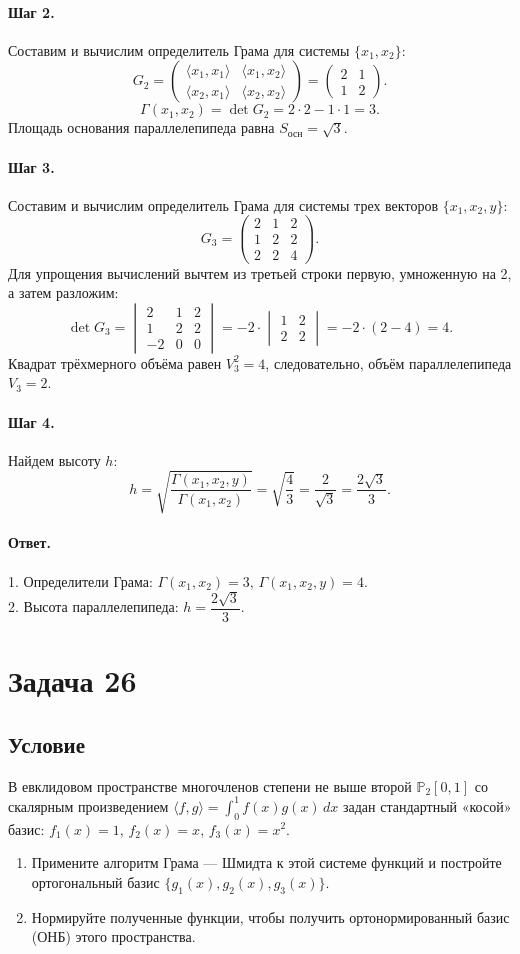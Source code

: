 \documentclass[12pt,a4paper]{article}
\theoremstyle{solution}
\newcommand{\task}[1]{\newpage\section*{Задача #1}}
\newcommand{\answer}{\paragraph{Ответ.}}
\newcommand{\step}[1]{\paragraph{Шаг #1.}}
\begin{document}
\step{2} Составим и вычислим определитель Грама для системы $\{x_1, x_2\}$:
\[
G_2 = \begin{pmatrix} \langle x_1, x_1\rangle & \langle x_1, x_2\rangle \\ \langle x_2, x_1\rangle & \langle x_2, x_2\rangle \end{pmatrix} = \begin{pmatrix} 2 & 1 \\ 1 & 2 \end{pmatrix}.
\]
\[
\Gamma(x_1, x_2) = \det G_2 = 2\cdot 2 - 1\cdot 1 = 3.
\]
Площадь основания параллелепипеда равна $S_{\text{осн}} = \sqrt{3}$.

\step{3} Составим и вычислим определитель Грама для системы трех векторов $\{x_1, x_2, y\}$:
\[
G_3 = \begin{pmatrix} 2 & 1 & 2 \\ 1 & 2 & 2 \\ 2 & 2 & 4 \end{pmatrix}.
\]
Для упрощения вычислений вычтем из третьей строки первую, умноженную на 2, а затем разложим:
\[
\det G_3 = \begin{vmatrix} 2 & 1 & 2 \\ 1 & 2 & 2 \\ -2 & 0 & 0 \end{vmatrix} = -2 \cdot \begin{vmatrix} 1 & 2 \\ 2 & 2 \end{vmatrix} = -2 \cdot (2 - 4) = 4.
\]
Квадрат трёхмерного объёма равен $V_3^2 = 4$, следовательно, объём параллелепипеда $V_3 = 2$.

\step{4} Найдем высоту $h$:
\[
h = \sqrt{\frac{\Gamma(x_1, x_2, y)}{\Gamma(x_1, x_2)}} = \sqrt{\frac{4}{3}} = \frac{2}{\sqrt{3}} = \frac{2\sqrt{3}}{3}.
\]

\answer
1. Определители Грама: $\Gamma(x_1, x_2) = 3$, $\Gamma(x_1, x_2, y) = 4$.\\
2. Высота параллелепипеда: $h = \dfrac{2\sqrt{3}}{3}$.
\task{26}
\subsection*{Условие}
В евклидовом пространстве многочленов степени не выше второй $\mathbb{P}_2[0, 1]$ со скалярным произведением $\displaystyle \langle f, g\rangle = \int_0^1 f(x)g(x)\,dx$ задан стандартный «косой» базис: $f_1(x) = 1$, $f_2(x) = x$, $f_3(x) = x^2$.
\begin{enumerate}
    \item Примените алгоритм Грама — Шмидта к этой системе функций и постройте ортогональный базис $\{g_1(x), g_2(x), g_3(x)\}$.
    \item Нормируйте полученные функции, чтобы получить ортонормированный базис (ОНБ) этого пространства.
\end{enumerate}
\end{document}
